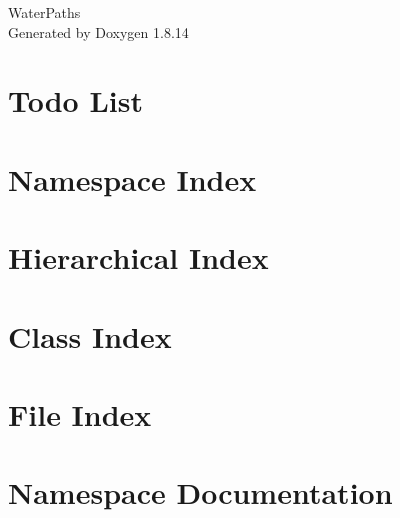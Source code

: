 \documentclass[twoside]{book}
\newcommand{\+}{\discretionary{\mbox{\scriptsize$\hookleftarrow$}}{}{}}
\newcommand{\clearemptydoublepage}{%
  \newpage{\pagestyle{empty}\cleardoublepage}%
}
\begin{document}
\hypersetup{pageanchor=false,
             bookmarksnumbered=true,
             pdfencoding=unicode
            }
\begin{titlepage}
\vspace*{7cm}
\begin{center}%
{\Large Water\+Paths }\\
\vspace*{1cm}
{\large Generated by Doxygen 1.8.14}\\
\end{center}
\end{titlepage}
\clearemptydoublepage
{}
\tableofcontents
\clearemptydoublepage
{}
\hypersetup{pageanchor=true}

\chapter{Todo List}
\label{todo}

\chapter{Namespace Index}

\chapter{Hierarchical Index}

\chapter{Class Index}

\chapter{File Index}

\chapter{Namespace Documentation}


\end{document}

